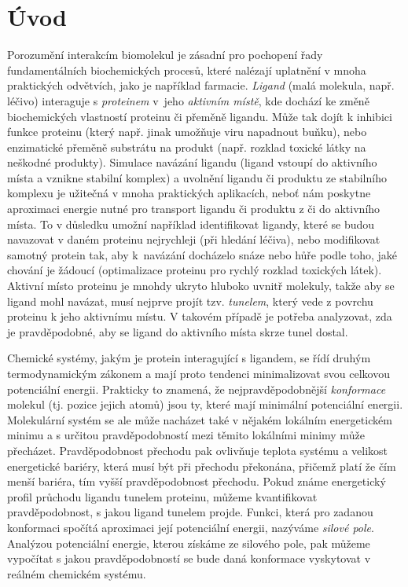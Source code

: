 \chapter*{Úvod}

Porozumění interakcím biomolekul je
zásadní pro pochopení řady fundamentálních biochemických procesů, které
nalézají uplatnění v mnoha praktických odvětvích, jako je například farmacie.
\textit{Ligand} (malá molekula, např. léčivo) interaguje s \textit{proteinem} 
v~jeho \textit{aktivním místě}, kde dochází ke změně biochemických vlastností proteinu
či přeměně ligandu. Může tak dojít k inhibici funkce proteinu (který např. 
jinak umožňuje viru napadnout buňku), nebo enzimatické přeměně substrátu na produkt 
(např. rozklad toxické látky na neškodné produkty). 
Simulace navázání ligandu (ligand vstoupí
do aktivního místa a vznikne stabilní komplex) a uvolnění ligandu či produktu ze stabilního komplexu 
je užitečná v mnoha praktických
aplikacích, neboť nám poskytne aproximaci energie nutné pro transport ligandu či produktu z či do aktivního místa. 
To v důsledku umožní například identifikovat ligandy, které se budou navazovat
v daném proteinu nejrychleji (při hledání léčiva), nebo modifikovat samotný protein tak, 
aby k~navázání docházelo snáze nebo hůře podle toho, jaké chování je žádoucí (optimalizace 
proteinu pro rychlý rozklad toxických látek). Aktivní
místo proteinu je mnohdy ukryto hluboko uvnitř molekuly, takže aby se ligand
mohl navázat, musí nejprve projít tzv. \textit{tunelem}, který vede z povrchu proteinu
k jeho aktivnímu místu. V takovém případě je potřeba analyzovat, zda je
pravděpodobné, aby se ligand do aktivního místa skrze tunel dostal.

Chemické systémy, jakým je protein interagující s ligandem, se řídí druhým
termodynamickým zákonem a mají proto tendenci minimalizovat svou
celkovou potenciální energii. Prakticky to znamená, že nejpravděpodobnější
\textit{konformace} molekul (tj. pozice jejich atomů) jsou ty, které mají minimální
potenciální energii. Molekulární systém se ale může nacházet také v nějakém
lokálním energetickém minimu a s určitou pravděpodobností mezi těmito lokálními
minimy může přecházet. Pravděpodobnost přechodu pak ovlivňuje teplota systému a
velikost energetické bariéry, která musí být při přechodu překonána, přičemž platí
že čím menší bariéra, tím vyšší pravděpodobnost přechodu. Pokud známe
energetický profil průchodu ligandu tunelem proteinu, můžeme kvantifikovat
pravděpodobnost, s jakou ligand tunelem projde. Funkci, která pro zadanou konformaci
spočítá aproximaci její potenciální energii, nazýváme \textit{silové pole}. Analýzou
potenciální energie, kterou získáme ze silového pole, pak můžeme vypočítat
s jakou pravděpodobností se bude daná konformace vyskytovat v reálném chemickém
systému. 

